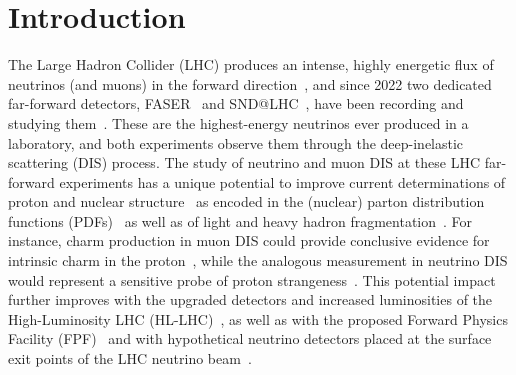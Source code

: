 \section{Introduction}
\label{sec:intro}

The Large Hadron Collider (LHC) produces an intense, highly energetic flux of neutrinos (and muons) in the forward direction~\cite{Kling:2021gos,Bai:2020ukz,Bai:2021ira,Bai:2022xad,Maciula:2022lzk,Bhattacharya:2023zei,Buonocore:2023kna,Kling:2023tgr,John:2025qlm}, and since 2022 two dedicated far-forward detectors, FASER~\cite{Feng:2017uoz, FASER:2019dxq,FASER:2020gpr,FASER:2022hcn} and SND@LHC~\cite{SNDLHC:2022ihg}, have been recording and studying them~\cite{FASER:2021mtu,FASER:2023zcr,SNDLHC:2023pun,SNDLHC:2023mib,SNDLHC:2024qqb,Ariga:2025lhcnu,SNDLHC:2026oxu,SNDLHC:2026mip,SNDLHC:2026yqa,FASER:2024hoe,FASER:2025qaf,FASER:2025sge,FASER:2026hzm,FASER:2026jhh,FASERnu:2026conf,Boyd:2026xuf,FASER:2026charm}.
%
These are the highest-energy neutrinos ever produced in a laboratory, and both experiments observe them through the deep-inelastic scattering (DIS) process.
%
The study of neutrino and muon DIS at these LHC far-forward experiments has a unique potential to improve current determinations of proton and nuclear structure~\cite{Cruz-Martinez:2023sdv,Francener:2025pnr} as encoded in the (nuclear) parton distribution functions (PDFs)~\cite{Gao:2017yyd,Klasen:2023uqj,Kovarik:2019xvh,Ethier:2020way} as well as of light and heavy hadron fragmentation~\cite{Albino:2008gy}.
%
For instance, charm production in muon DIS could provide conclusive evidence for intrinsic charm in the proton~\cite{Brodsky:1980pb,Ball:2022qks,Guzzi:2022rca,Brodsky:2015fna,Ball:2016neh}, while the analogous measurement in neutrino DIS would represent a sensitive probe of proton strangeness~\cite{Faura:2020oom}.
%
This potential impact further improves with the upgraded detectors and increased luminosities of the High-Luminosity LHC (HL-LHC)~\cite{FASER:2025upgrade,SNDLHC:2025eppsu,SNDLHC:2026why}, as well as with the proposed Forward Physics Facility (FPF)~\cite{FPF:2025bor,FPFWorkingGroups:2025rsc,Feng:2022inv,Anchordoqui:2021ghd,Adhikary:2024nlv} and with hypothetical neutrino detectors placed at the surface exit points of the LHC neutrino beam~\cite{Ariga:2020tnq, Kamp:2025phs}.

